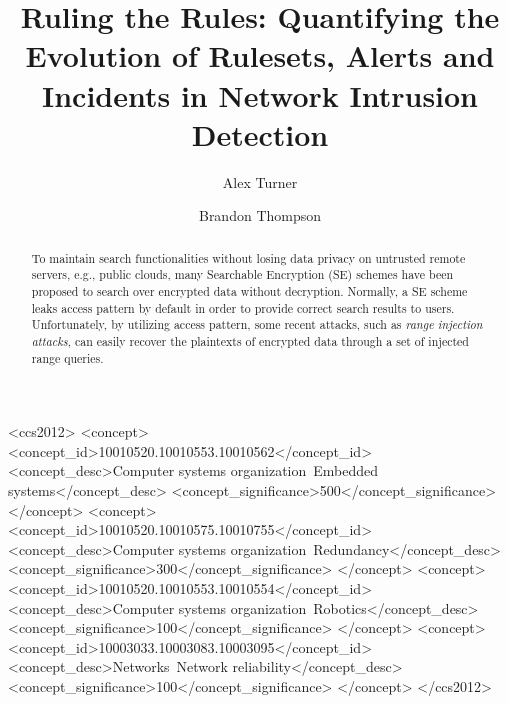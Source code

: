 \documentclass[sigconf]{acmart}
\begin{document}
\title{Ruling the Rules: Quantifying the Evolution of Rulesets, Alerts and Incidents in Network Intrusion Detection}


\author{Alex Turner}

\author{Brandon Thompson}


\renewcommand{\shortauthors}{B. Wang et al.}


\begin{abstract}
To maintain search functionalities without losing data privacy on untrusted remote servers, e.g., public clouds, many Searchable Encryption (SE) schemes have been proposed to search over encrypted data without decryption. Normally, a SE scheme leaks access pattern by default in order to provide correct search results to users. Unfortunately, by utilizing access pattern, some recent attacks, such as \textit{range injection attacks}, can easily recover the plaintexts of encrypted data through a set of injected range queries. 
\end{abstract}

%
%
\begin{CCSXML}
<ccs2012>
 <concept>
  <concept_id>10010520.10010553.10010562</concept_id>
  <concept_desc>Computer systems organization~Embedded systems</concept_desc>
  <concept_significance>500</concept_significance>
 </concept>
 <concept>
  <concept_id>10010520.10010575.10010755</concept_id>
  <concept_desc>Computer systems organization~Redundancy</concept_desc>
  <concept_significance>300</concept_significance>
 </concept>
 <concept>
  <concept_id>10010520.10010553.10010554</concept_id>
  <concept_desc>Computer systems organization~Robotics</concept_desc>
  <concept_significance>100</concept_significance>
 </concept>
 <concept>
  <concept_id>10003033.10003083.10003095</concept_id>
  <concept_desc>Networks~Network reliability</concept_desc>
  <concept_significance>100</concept_significance>
 </concept>
</ccs2012>  
\end{CCSXML}
\end{document}
